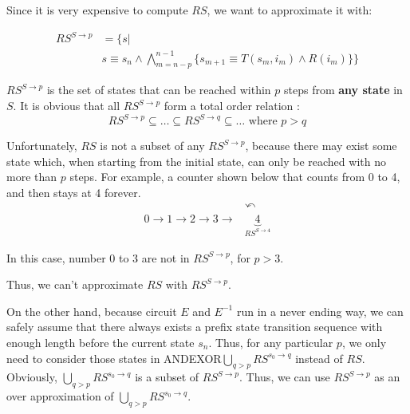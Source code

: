 \documentclass[journal]{IEEEtran}
\begin{document}
Since it is very expensive to compute $RS$,
we want to approximate it with:

\begin{equation}\label{apprse}
\begin{split}
RS^{S\to p} & =  \Big\{s| \\
& s\equiv s_n\wedge \bigwedge_{m=n-p}^{n-1}\big\{
s_{m+1}\equiv T(s_m,i_m)\wedge R(i_m)
\big\}\Big\}
\end{split}
\end{equation}

$RS^{S\to p}$ is the set of states that can be reached within $p$ steps from \textbf{any state} in $S$.
It is obvious that all $RS^{S\to p}$ form a total order relation :
\begin{displaymath}
RS^{S\to p}\subseteq\dots \subseteq RS^{S\to q}\subseteq\dots \textrm{  where } p>q
\end{displaymath}
%

Unfortunately,
$RS$ is not a subset of any $RS^{S\to p}$,
because there may exist some state which,
when starting from the initial state,
can only be reached with no more than $p$ steps.
For example,
a counter shown below that counts from 0 to 4,
and then stays at 4 forever.
\begin{displaymath}
\begin{array}{cc}
&\curvearrowleft \\
0\to 1\to 2\to 3\to & \underbrace{4}_{RS^{S\to 4}}
\end{array}
\end{displaymath}


In this case,
number 0 to 3 are not in $RS^{S\to p}$,
for $p>3$.

Thus,
we can't approximate $RS$ with $RS^{S\to p}$.

On the other hand,
because circuit $E$ and $E^{-1}$ run in a never ending way,
we can safely assume that there always exists a prefix state transition sequence with enough length before the current state $s_n$.
Thus,
for any particular $p$,
we only need to consider those states in ANDEXOR$\bigcup_{q>p}RS^{s_0\to q}$ instead of $RS$.
Obviously,
$\bigcup_{q>p}RS^{s_0\to q}$ is a subset of $RS^{S\to p}$.
Thus,
we can use $RS^{S\to p}$ as an over approximation of $\bigcup_{q>p}RS^{s_0\to q}$.
\end{document}
